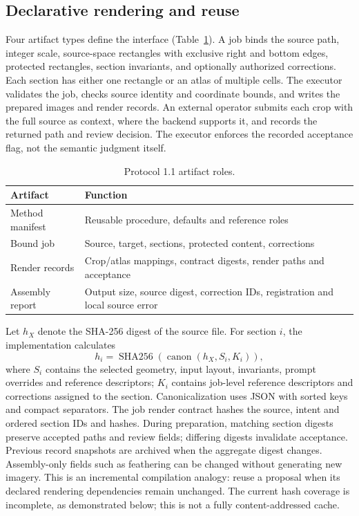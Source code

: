 \documentclass[10pt,twocolumn]{article}
\begin{document}
\subsection{Declarative rendering and reuse}
Four artifact types define the interface (Table~\ref{tab:artifacts}). A job binds the source path, integer scale, source-space rectangles with exclusive right and bottom edges, protected rectangles, section invariants, and optionally authorized corrections. Each section has either one rectangle or an atlas of multiple cells. The executor validates the job, checks source identity and coordinate bounds, and writes the prepared images and render records. An external operator submits each crop with the full source as context, where the backend supports it, and records the returned path and review decision. The executor enforces the recorded acceptance flag, not the semantic judgment itself.
\begin{table}[h]
\centering\small
\caption{Protocol 1.1 artifact roles.}\label{tab:artifacts}
\begin{tabularx}{\columnwidth}{@{}p{}X@{}}
\toprule Artifact & Function \\\midrule
Method manifest & Reusable procedure, defaults and reference roles \\
Bound job & Source, target, sections, protected content, corrections \\
Render records & Crop/atlas mappings, contract digests, render paths and acceptance \\
Assembly report & Output size, source digest, correction IDs, registration and local source error \\\bottomrule
\end{tabularx}
\end{table}
Let $h_X$ denote the SHA-256 digest of the source file. For section $i$, the implementation calculates
\begin{equation}
h_i=\operatorname{SHA256}(\operatorname{canon}(h_X,S_i,K_i)),
\end{equation}
where $S_i$ contains the selected geometry, input layout, invariants, prompt overrides and reference descriptors; $K_i$ contains job-level reference descriptors and corrections assigned to the section. Canonicalization uses JSON with sorted keys and compact separators. The job render contract hashes the source, intent and ordered section IDs and hashes. During preparation, matching section digests preserve accepted paths and review fields; differing digests invalidate acceptance. Previous record snapshots are archived when the aggregate digest changes. Assembly-only fields such as feathering can be changed without generating new imagery. This is an incremental compilation analogy: reuse a proposal when its declared rendering dependencies remain unchanged. The current hash coverage is incomplete, as demonstrated below; this is not a fully content-addressed cache.
\end{document}
